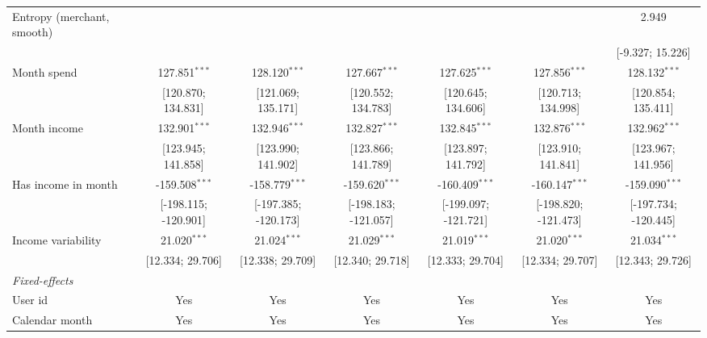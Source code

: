 \begin{table}[htbp]
\begin{threeparttable}[b]
\begin{tabular}{lcccccc}
         Entropy (merchant, smooth) &                      &                      &                      &                      &                      & 2.949\\   
                                    &                      &                      &                      &                      &                      & [-9.327; 15.226]\\   
         Month spend                & 127.851$^{***}$      & 128.120$^{***}$      & 127.667$^{***}$      & 127.625$^{***}$      & 127.856$^{***}$      & 128.132$^{***}$\\   
                                    & [120.870; 134.831]   & [121.069; 135.171]   & [120.552; 134.783]   & [120.645; 134.606]   & [120.713; 134.998]   & [120.854; 135.411]\\   
         Month income               & 132.901$^{***}$      & 132.946$^{***}$      & 132.827$^{***}$      & 132.845$^{***}$      & 132.876$^{***}$      & 132.962$^{***}$\\   
                                    & [123.945; 141.858]   & [123.990; 141.902]   & [123.866; 141.789]   & [123.897; 141.792]   & [123.910; 141.841]   & [123.967; 141.956]\\   
         Has income in month        & -159.508$^{***}$     & -158.779$^{***}$     & -159.620$^{***}$     & -160.409$^{***}$     & -160.147$^{***}$     & -159.090$^{***}$\\   
                                    & [-198.115; -120.901] & [-197.385; -120.173] & [-198.183; -121.057] & [-199.097; -121.721] & [-198.820; -121.473] & [-197.734; -120.445]\\   
         Income variability         & 21.020$^{***}$       & 21.024$^{***}$       & 21.029$^{***}$       & 21.019$^{***}$       & 21.020$^{***}$       & 21.034$^{***}$\\   
                                    & [12.334; 29.706]     & [12.338; 29.709]     & [12.340; 29.718]     & [12.333; 29.704]     & [12.334; 29.707]     & [12.343; 29.726]\\   
         \midrule
         \emph{Fixed-effects}\\
         User id                    & Yes                  & Yes                  & Yes                  & Yes                  & Yes                  & Yes\\  
         Calendar month             & Yes                  & Yes                  & Yes                  & Yes                  & Yes                  & Yes\\  

\end{tabular}
\end{threeparttable}
\end{table}
